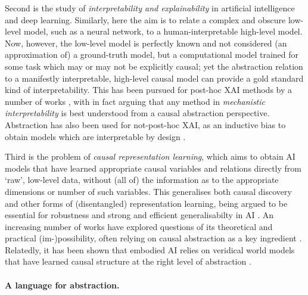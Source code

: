 \documentclass{article}
\begin{document}
Second is the study of \emph{interpretability and explainability} in artificial intelligence and deep learning. Similarly, here the aim is to relate a complex and obscure low-level model, such as a neural network, to a human-interpretable high-level model. Now, however, the low-level model is perfectly known and not considered (an approximation of) a ground-truth model, but a computational model trained for some task which may or may not be explicitly causal; yet the abstraction relation to a manifestly interpretable, high-level causal model can provide a gold standard kind of interpretability. This has been pursued for post-hoc XAI methods by a number of works \cite{geiger-etal-2020-neural, GeigerEtAl_2021_CausalAbstracttoinOfNN, hu2022neuron, Beckers_2022_CausalExplanationsAndXAI, WuEtAl_2023_InterpretabilityatScale, geiger2024finding, geiger2023causal, wu2024reply, pislar2025combining}, with \cite{geiger2023causal} in fact arguing that any method in \emph{mechanistic interpretability} is best understood from a causal abstraction perspective.  
Abstraction has also been used for not-post-hoc XAI, as an inductive bias to obtain models which are interpretable by design \cite{GeigerEtAl_2022_InducingCausalStructureForInterpretableNN}. 

Third is the problem of \emph{causal representation learning}, which aims to obtain AI models that have learned appropriate causal variables and relations directly from `raw', low-level data, without (all of) the information as to the appropriate dimensions or number of such variables. This generalises both causal discovery and other forms of (disentangled) representation learning, being argued to be essential for robustness and strong and efficient generalisabilty in AI \cite{scholkopf2021toward}.  An increasing number of works have explored questions of its theoretical and practical (im-)possibility, often relying on causal abstraction as a key ingredient \cite{brehmer2022weakly, yao2023multi, kekic2023targeted,  yao2024unifying, kori2025unifying, li2025identifiability, zhu2024unsupervised}. Relatedly, it has been shown that embodied AI relies on veridical world models that have learned causal structure at the right level of abstraction \cite{gupta2024essential, richens2024robust, richens2025general}. 


\paragraph{A language for abstraction.}
\end{document}
